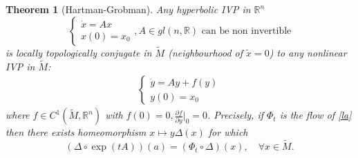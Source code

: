 \documentclass{article}
\newtheorem*{theorem}{Theorem}
\theoremstyle{named}
\begin{document}
\begin{theorem}[Hartman-Grobman]
Any hyperbolic IVP in $\mathbb R^n$
\[
	\begin{cases}
		\dot x = Ax \\ 
		x(0) = x_0
	\end{cases}, A \in gl(n, \mathbb R) \text{ can be non invertible}
\]
is locally topologically conjugate in $\tilde M$ (neighbourhood of $\tilde x = 0$) to any nonlinear IVP in $\tilde M$:
\begin{align}\label{la}
	\begin{cases}
		\dot y = Ay + f(y) \\
		y(0) = x_0
	\end{cases}
\end{align}
where $f \in C^1(\tilde M, \mathbb R^n)$ with $f(0) = 0, \frac{\partial f}{\partial y}\Big \vert_0 = 0$. Precisely, if $\Phi_t$ is the flow of \eqref{la} then there exists homeomorphism $x \mapsto y \Delta (x)$ for which
\[
	(\Delta \circ \exp(tA)) (a) = (\Phi_t \circ \Delta) (x) , \quad \forall x \in \tilde M.
\]
\end{theorem}
\end{document}
